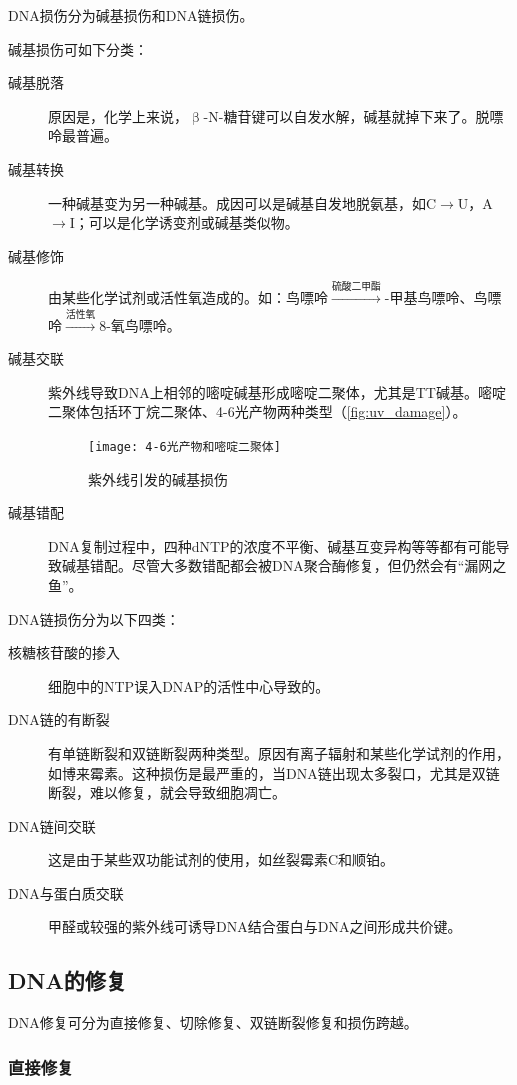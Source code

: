 DNA损伤分为碱基损伤和DNA链损伤。

碱基损伤可如下分类：\begin{description}
	\item[碱基脱落] 原因是，化学上来说，$\upbeta$-N-糖苷键可以自发水解，碱基就掉下来了。脱嘌呤最普遍。
	\item[碱基转换] 一种碱基变为另一种碱基。成因可以是碱基自发地脱氨基，如C$\longrightarrow$U，A$\longrightarrow$I；可以是化学诱变剂或碱基类似物。
	\item[碱基修饰] 由某些化学试剂或活性氧造成的。如：鸟嘌呤$\xrightarrow{\text{硫酸二甲酯}}$-甲基鸟嘌呤、鸟嘌呤$\xrightarrow{\text{活性氧}}$8-氧鸟嘌呤。
	\item[碱基交联] 紫外线导致DNA上相邻的嘧啶碱基形成嘧啶二聚体，尤其是TT碱基。嘧啶二聚体包括环丁烷二聚体、4-6光产物两种类型（\autoref{fig:uv_damage}）。
	\begin{figure}[h!]
		\centering
		\texttt{[image: 4-6光产物和嘧啶二聚体]}
		\caption{紫外线引发的碱基损伤}
		\label{fig:uv_damage}
	\end{figure}
	\item[碱基错配] DNA复制过程中，四种dNTP的浓度不平衡、碱基互变异构等等都有可能导致碱基错配。尽管大多数错配都会被DNA聚合酶修复，但仍然会有“漏网之鱼”。
\end{description}

DNA链损伤分为以下四类：\begin{description}
	\item[核糖核苷酸的掺入] 细胞中的NTP误入DNAP的活性中心导致的。
	\item[DNA链的有断裂] 有单链断裂和双链断裂两种类型。原因有离子辐射和某些化学试剂的作用，如博来霉素。这种损伤是最严重的，当DNA链出现太多裂口，尤其是双链断裂，难以修复，就会导致细胞凋亡。
	\item[DNA链间交联] 这是由于某些双功能试剂的使用，如丝裂霉素C和顺铂。
	\item[DNA与蛋白质交联] 甲醛或较强的紫外线可诱导DNA结合蛋白与DNA之间形成共价键。
\end{description}

\subsection{DNA的修复}

DNA修复可分为直接修复、切除修复、双链断裂修复和损伤跨越。

\subsubsection{直接修复}

